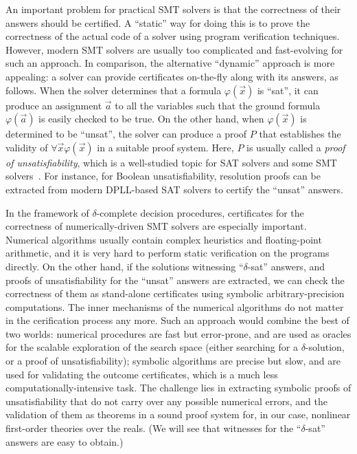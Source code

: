 \documentclass[envcountsect]{llncs}
\begin{document}
An important problem for practical SMT solvers is that the correctness
of
their answers should be certified. A ``static'' way for doing this is to prove
the correctness of the actual code of a solver using program verification
techniques. However, modern SMT solvers are usually too complicated and
fast-evolving for such an approach. In comparison, the alternative ``dynamic''
approach is more appealing: a solver can provide certificates on-the-fly along
with its answers, as follows. When the solver determines that a formula
$\varphi(\vec x)$ is ``sat'', it can produce an assignment $\vec a$ to all the
variables such that the ground formula $\varphi(\vec a)$ is easily checked to be
true. On the other hand, when $\varphi(\vec x)$ is determined to be ``unsat'',
the solver can produce a proof $P$ that establishes the validity of $\forall
\vec x \varphi(\vec x)$ in a suitable proof system. Here, $P$ is usually called
a {\em proof of unsatisfiability}, which is a well-studied topic for SAT solvers
and some SMT solvers~\cite{}. For instance, for Boolean unsatisfiability,
resolution proofs can be extracted from modern DPLL-based SAT solvers to certify
the ``unsat'' answers. 

In the framework of $\delta$-complete decision procedures, certificates for
the correctness of numerically-driven SMT solvers are especially important.
Numerical algorithms usually contain complex heuristics and floating-point
arithmetic, and it is very hard to perform static verification on the programs
directly. On the other hand, if the solutions witnessing ``$\delta$-sat''
answers, and proofs of unsatisfiability for the ``unsat'' answers are extracted,
we can check the correctness of them as stand-alone certificates using symbolic
arbitrary-precision computations. The inner mechanisms of the numerical
algorithms do not matter in the cerification process any more. Such an approach
 would combine the best of two worlds: numerical procedures are
fast but error-prone, and are used as oracles for the scalable exploration of
the search space (either searching for a $\delta$-solution, or a proof of
unsatisfiability); symbolic algorithms are precise but slow, and are used for
validating the outcome certificates, which is a much less
computationally-intensive task. The challenge lies in
extracting symbolic proofs of unsatisfiability that do not carry over any
possible numerical errors, and the validation of them as theorems in a sound
proof system for, in our case, nonlinear first-order theories over the reals.
(We will see that witnesses for the ``$\delta$-sat'' answers are easy to
obtain.)
\end{document}
